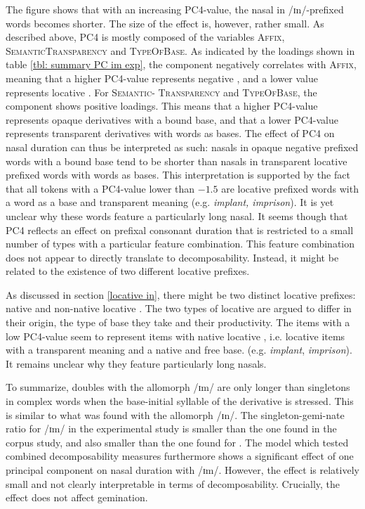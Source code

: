 The figure shows that with an increasing \textsc{PC4}-value, the nasal in /ɪn/-prefixed words becomes shorter. The size of the effect is, however, rather small. 
As described above, \textsc{PC4} is mostly composed of the variables \textsc{Affix}, \textsc{SemanticTransparency} and \textsc{TypeOfBase}. As indicated by the loadings shown in table \ref{tbl: summary PC im exp}, the component negatively correlates with \textsc{Affix}, meaning that a higher \textsc{PC4}-value represents negative , and a lower value represents locative . For \textsc{Semantic- Transparency} and \textsc{TypeOfBase}, the component shows positive loadings. This means that a higher \textsc{PC4}-value represents opaque derivatives with a bound base, and that a lower \textsc{PC4}-value represents transparent derivatives with words as bases.
The effect of \textsc{PC4} on nasal duration can thus be interpreted as such: nasals in opaque negative prefixed words with a bound base tend to be shorter than nasals in transparent locative prefixed words with words as bases. This interpretation is supported by the fact that all tokens with a \textsc{PC4}-value lower than $-1.5$ are locative prefixed words with a word as a base and transparent meaning (e.g. \textit{implant, imprison}). It is yet unclear why these words feature a particularly long nasal. 
It seems though that \textsc{PC4} reflects an effect on prefixal consonant duration that is restricted to a small number of types with a particular feature combination. This feature combination does not appear to directly translate to decomposability.  
Instead, it might be related to the existence of two different locative prefixes. 

As discussed in section \ref{locative in}, there might be two distinct locative prefixes: native and non-native locative . The two types of locative  are argued to differ in their origin, the type of base they take and their productivity. The items with a low \textsc{PC4}-value seem to represent items with native locative , i.e. locative items with a transparent meaning and a native and free base. (e.g. \textit{implant}, \textit{imprison}). It remains unclear why they feature particularly long nasals.



To summarize,  doubles with the allomorph /ɪm/ are only longer than singletons in complex words when the base-initial syllable of the derivative is stressed. This is similar to what was found with the allomorph /ɪn/. The singleton-gemi-nate ratio for /ɪm/ in the experimental study is smaller than the one found in the corpus study, and also smaller than the one found for . 
The model which tested combined decomposability measures furthermore shows a significant effect of one principal component on nasal duration with /ɪm/. However, the effect is relatively small and not clearly interpretable in terms of decomposability. Crucially, the effect does not affect gemination.




